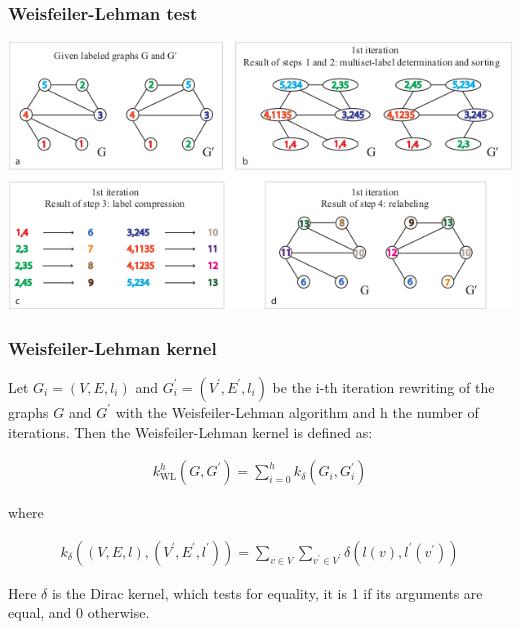 \documentclass{beamer}
\begin{document}
\begin{frame}
\frametitle{Weisfeiler-Lehman test}

\begin{center}
\begin{figure}
\end{figure}
\includegraphics[width=\textwidth]{img/wl_iteration_upper.png}
\end{center}

\end{frame}


\begin{frame}
\frametitle{Weisfeiler-Lehman kernel}

\begin{definition}
Let $G_i = (V, E, l_i)$ and $G_i^\prime = (V^\prime , E^\prime , l_i)$ be the i-th iteration rewriting of the graphs $G$ and $G^\prime$ with the Weisfeiler-Lehman algorithm and h the number of iterations. Then the Weisfeiler-Lehman kernel is defined as:

\begin{align}
k_{\mathrm{WL}}^{h}\left(G, G^\prime\right)=\sum_{i=0}^h k_\delta\left(G_i, G_i^\prime\right)
\end{align}

where

\begin{align}
k_\delta\left((V, E, l),\left(V^\prime, E^\prime, l^\prime\right)\right)=\sum_{v \in V} \sum_{v^{\prime} \in V^{\prime}} \delta\left(l(v), l^{\prime}\left(v^{\prime}\right)\right)
\end{align}

Here $\delta$ is the Dirac kernel, which tests for equality, it is 1 if its arguments are equal, and 0 otherwise.
\end{definition}

\end{frame}
\end{document}
